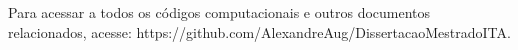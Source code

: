 \label{ap_apendiceD_codigos}

Para acessar a todos os códigos computacionais e outros documentos relacionados, acesse: https://github.com/AlexandreAug/DissertacaoMestradoITA.
